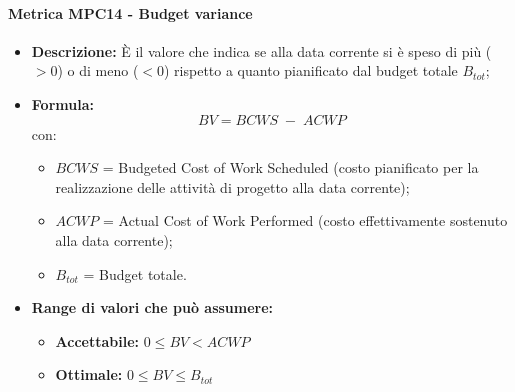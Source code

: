     \paragraph{Metrica MPC14 - Budget variance}
        \begin{itemize}
            \item \textbf{Descrizione:} È il valore che indica se alla data corrente si è speso di più ($>0$) o di meno ($<0$) rispetto a quanto pianificato dal budget totale $B_{tot}$;
            \item \textbf{Formula:} $$BV = {BCWS \; - \; ACWP}$$
            con:
            \begin{itemize}
                \item $BCWS$ = Budgeted Cost of Work Scheduled (costo pianificato per la realizzazione delle attività di progetto alla data corrente);
                \item $ACWP$ = Actual Cost of Work Performed (costo effettivamente sostenuto alla data corrente);
                \item $B_{tot}$ = Budget totale.
            \end{itemize}
            \item \textbf{Range di valori che può assumere:}
            \begin{itemize}
                \item \textbf{Accettabile:} $0 \leq BV < ACWP$
                \item \textbf{Ottimale:} $0 \leq BV \leq B_{tot}$
            \end{itemize}
        \end{itemize}

